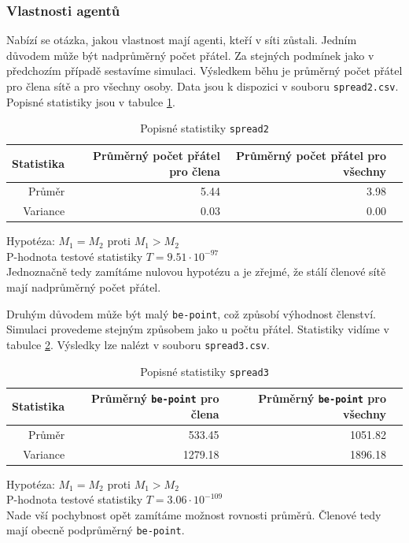 \documentclass[a4wide,12pt]{report}
\begin{document}
\subsubsection{Vlastnosti agentů}
Nabízí se otázka, jakou vlastnost mají agenti, kteří v síti zůstali. Jedním důvodem může být nadprůměrný počet přátel. Za stejných podmínek jako v předchozím případě sestavíme simulaci. Výsledkem běhu je průměrný počet přátel pro člena sítě a pro všechny osoby. Data jsou k dispozici v souboru \texttt{spread2.csv}. Popisné statistiky jsou v tabulce \ref{tab:spread2_desc}.
\begin{table}[H]
  \begin{center}
  \begin{tabular}{|r|r|r|r|}
  \hline
  Statistika&Průměrný počet přátel pro člena	&Průměrný počet přátel pro všechny\\\hline
  Průměr	&5.44	&3.98\\

  Variance	&0.03	&0.00\\\hline
  \end{tabular}
  \end{center}
  \caption{Popisné statistiky \texttt{spread2}}
  \label{tab:spread2_desc}
\end{table}
\noindent
Hypotéza: $M_1=M_2$ proti $M_1>M_2$\\
P-hodnota testové statistiky $T = 9.51\cdot 10^{-97}$\\
Jednoznačně tedy zamítáme nulovou hypotézu a je zřejmé, že stálí členové sítě mají nadprůměrný počet přátel.\vspace{3mm}

Druhým důvodem může být malý \texttt{be-point}, což způsobí výhodnost členství. Simulaci provedeme stejným způsobem jako u počtu přátel. Statistiky vidíme v tabulce \ref{tab:spread3_desc}. Výsledky lze nalézt v souboru \texttt{spread3.csv}.
\begin{table}[H]
  \begin{center}
  \begin{tabular}{|r|r|r|r|}
  \hline
  Statistika&Průměrný \texttt{be-point} pro člena	&Průměrný \texttt{be-point} pro všechny\\\hline
  Průměr	&533.45	&1051.82\\

  Variance	&1279.18	&1896.18\\\hline
  \end{tabular}
  \end{center}
  \caption{Popisné statistiky \texttt{spread3}}
  \label{tab:spread3_desc}
\end{table}
\noindent
Hypotéza: $M_1=M_2$ proti $M_1>M_2$\\
P-hodnota testové statistiky $T = 3.06\cdot 10^{-109}$\\
Nade vší pochybnost opět zamítáme možnost rovnosti průměrů. Členové tedy mají obecně podprůměrný \texttt{be-point}.\vspace{3mm}
\end{document}
